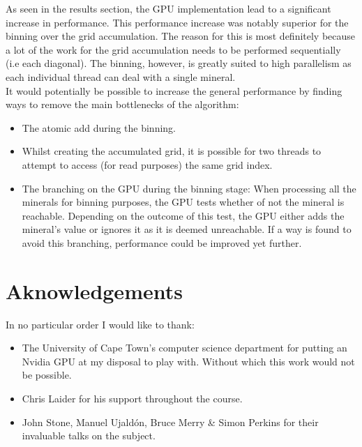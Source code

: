 \documentclass[11pt]{IEEEtran}
\begin{document}
As seen in the results section, the GPU implementation lead to a significant increase in performance. This performance increase was notably superior for the binning over the grid accumulation. The reason for this is most definitely because a lot of the work for the grid accumulation needs to be performed sequentially (i.e each diagonal). The binning, however, is greatly suited to high parallelism as each individual thread can deal with a single mineral.\\
It would potentially be possible to increase the general performance by finding ways to remove the main bottlenecks of the algorithm:
\begin{itemize}
\item The atomic add during the binning.
\item Whilst creating the accumulated grid, it is possible for two threads to attempt to access (for read purposes) the same grid index. 
\item The branching on the GPU during the binning stage: When processing all the minerals for binning purposes, the GPU tests whether of not the mineral is reachable. Depending on the outcome of this test, the GPU either adds the mineral's value or ignores it as it is deemed unreachable. If a way is found to avoid this branching, performance could be improved yet further.
\end{itemize}

\section{Aknowledgements}
In no particular order I would like to thank:
\begin{itemize}
\item The University of Cape Town's computer science department for putting an Nvidia GPU at my disposal to play with. Without which this work would not be possible.
\item Chris Laider for his support throughout the course.
\item John Stone, Manuel Ujaldón, Bruce Merry \& Simon Perkins for their invaluable talks on the subject.
\end{itemize}
\end{document}
